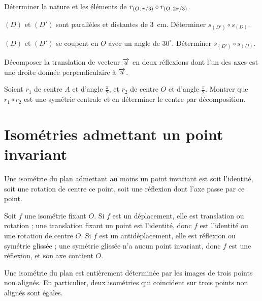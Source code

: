 \begin{entrainement}
\exo[\niveau{1}] Déterminer la nature et les éléments de
$r_{(O,\,\pi/3)} \circ r_{(O,\,2\pi/3)}$.

\exo[\niveau{2}] $(D)$ et $(D')$ sont parallèles et distantes de $3$~cm.
Déterminer $s_{(D')} \circ s_{(D)}$.

\exo[\niveau{2}] $(D)$ et $(D')$ se coupent en $O$ avec un angle de
$30^{\circ}$. Déterminer $s_{(D')} \circ s_{(D)}$.

\exo[\niveau{2}] Décomposer la translation de vecteur $\overrightarrow{u}$ en deux
réflexions dont l'un des axes est une droite donnée perpendiculaire à
$\overrightarrow{u}$.

\exo[\niveau{3}] Soient $r_{1}$ de centre $A$ et d'angle $\frac{\pi}{2}$, et
$r_{2}$ de centre $O$ et d'angle $\frac{\pi}{2}$. Montrer que
$r_{1} \circ r_{2}$ est une symétrie centrale et en déterminer le centre par
décomposition.
\end{entrainement}

\section{Isométries admettant un point invariant}

\begin{theoreme}
Une isométrie du plan admettant au moins un point invariant est soit
l'identité, soit une rotation de centre ce point, soit une réflexion dont
l'axe passe par ce point.
\end{theoreme}

\begin{demonstration}
Soit $f$ une isométrie fixant $O$. Si $f$ est un déplacement, elle est
translation ou rotation ; une translation fixant un point est l'identité, donc
$f$ est l'identité ou une rotation de centre $O$. Si $f$ est un
antidéplacement, elle est réflexion ou symétrie glissée ; une symétrie glissée
n'a aucun point invariant, donc $f$ est une réflexion, et son axe contient
$O$.
\end{demonstration}

\begin{propriete}
Une isométrie du plan est entièrement déterminée par les images de trois
points non alignés. En particulier, deux isométries qui coïncident sur trois
points non alignés sont égales.
\end{propriete}

